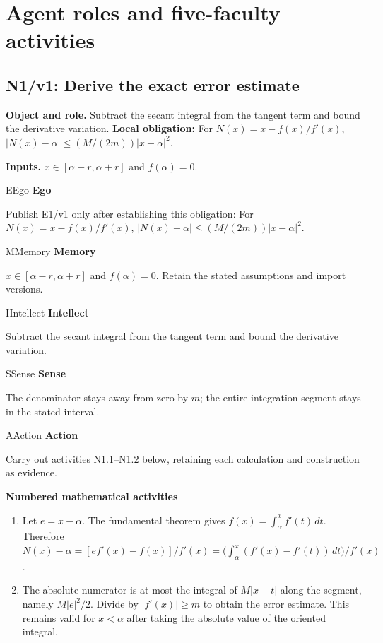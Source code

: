 \documentclass[preprint,12pt,aps,pra,showkeys,amsmath,amssymb,superscriptaddress,floatfix]{revtex4-2}
\theoremstyle{definition}
\theoremstyle{remark}
\newcommand{\mmfaculty}[3]{%
 \begin{mmfacultybox}{#1}{#2}
 {\sffamily\bfseries\color{MMBlue}#2}\par\smallskip #3
 \end{mmfacultybox}}
\newcommand{\field}[2]{\par\smallskip\noindent\textbf{#1.} #2\par}
\begin{document}
\endgroup

\clearpage\section{Agent roles and five-faculty activities}\begingroup\small\linespread{1.05}\selectfont{}

\subsection{N1/v1: Derive the exact error estimate}

\field{Object and role}{Subtract the secant integral from the tangent term and bound the
derivative variation. \textbf{Local obligation:} For
\(N(x)=x-f(x)/f'(x)\), \(|N(x)-\alpha|\le (M/(2m))|x-\alpha|^2\).}

\field{Inputs}{\(x\in[\alpha-r,\alpha+r]\) and \(f(\alpha)=0\).}

\mmfaculty{E}{Ego}{Publish E1/v1 only after establishing this obligation: For
\(N(x)=x-f(x)/f'(x)\), \(|N(x)-\alpha|\le (M/(2m))|x-\alpha|^2\).}

\mmfaculty{M}{Memory}{\(x\in[\alpha-r,\alpha+r]\) and \(f(\alpha)=0\). Retain the stated
assumptions and import versions.}

\mmfaculty{I}{Intellect}{Subtract the secant integral from the tangent term and bound the
derivative variation.}

\mmfaculty{S}{Sense}{The denominator stays away from zero by \(m\); the entire integration
segment stays in the stated interval.}

\mmfaculty{A}{Action}{Carry out activities N1.1--N1.2 below, retaining each calculation and
construction as evidence.}

\smallskip\noindent\textbf{Numbered mathematical activities}

\begin{enumerate}[label=N1.\arabic*,leftmargin=3.4em]

\item Let \(e=x-\alpha\). The fundamental theorem gives
\(f(x)=\int_\alpha^x f'(t)\,dt\). Therefore
\(N(x)-\alpha=[e f'(x)-f(x)]/f'(x)=\bigl(\int_\alpha^x(f'(x)-f'(t))\,dt\bigr)/f'(x)\).

\item The absolute numerator is at most the integral of \(M|x-t|\) along the
segment, namely \(M|e|^2/2\). Divide by \(|f'(x)|\ge m\) to obtain the
error estimate. This remains valid for \(x<\alpha\) after taking the
absolute value of the oriented integral.

\end{enumerate}
\end{document}
